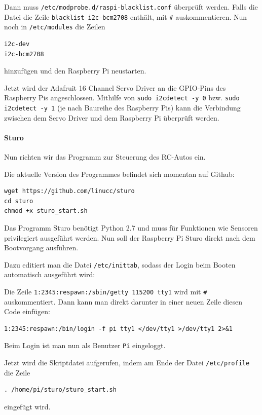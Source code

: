 \documentclass[a4paper,10pt]{scrartcl}
\begin{document}
    Dann muss \lstinline{/etc/modprobe.d/raspi-blacklist.conf} überprüft werden.
    Falls die Datei die Zeile \lstinline{blacklist i2c-bcm2708} enthält, mit
    \lstinline{#} auskommentieren.
    Nun noch in \lstinline{/etc/modules} die Zeilen
    \begin{lstlisting}
i2c-dev
i2c-bcm2708
    \end{lstlisting}

    hinzufügen und den Raspberry Pi neustarten.

    Jetzt wird der Adafruit 16 Channel Servo Driver an die GPIO-Pins des
    Raspberry Pis angeschlossen.
    Mithilfe von \lstinline{sudo i2cdetect -y 0} bzw.
    \lstinline{sudo i2cdetect -y 1} (je nach Baureihe des Raspberry Pis) kann
    die Verbindung zwischen dem Servo Driver und dem Raspberry Pi überprüft
    werden.\cite{adafruitlearn}

  \paragraph{Sturo} Nun richten wir das Programm zur Steuerung des RC-Autos ein.

    Die aktuelle Version des Programmes befindet sich momentan auf Github:

    \begin{lstlisting}
wget https://github.com/linucc/sturo
cd sturo
chmod +x sturo_start.sh
    \end{lstlisting}

    Das Programm Sturo benötigt Python 2.7 und muss für Funktionen wie Sensoren
    privilegiert ausgeführt werden.
    Nun soll der Raspberry Pi Sturo direkt nach dem Bootvorgang ausführen.

    Dazu editiert man die Datei \lstinline{/etc/inittab}, sodass der Login beim
    Booten automatisch ausgeführt wird:

    Die Zeile \lstinline{1:2345:respawn:/sbin/getty 115200 tty1} wird mit
    \lstinline{#} auskommentiert.
    Dann kann man direkt darunter in einer neuen Zeile diesen Code einfügen:
    \begin{lstlisting}
1:2345:respawn:/bin/login -f pi tty1 </dev/tty1 >/dev/tty1 2>&1
    \end{lstlisting}
    Beim Login ist man nun als Benutzer \lstinline{Pi} eingeloggt.
    \cite{opentech}

    Jetzt wird die Skriptdatei aufgerufen, indem am Ende der Datei
    \lstinline{/etc/profile} die Zeile
    \begin{lstlisting}
. /home/pi/sturo/sturo_start.sh
    \end{lstlisting}
    eingefügt wird.
\end{document}
